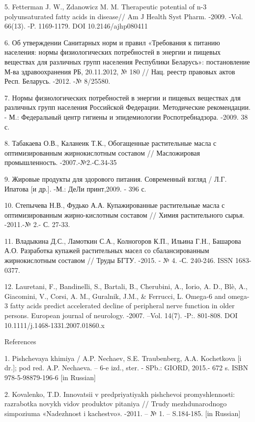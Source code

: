 5. Fetterman J. W., Zdanowicz M. M. Therapeutic potential of n-3
polyunsaturated fatty acids in disease// Am J Health Syst Pharm. -2009.
-Vol. 66(13). -P. 1169-1179. DOI 10.2146/ajhp080411

6. Об утверждении Санитарных норм и правил «Требования к питанию
населения: нормы физиологических потребностей в энергии и пищевых
веществах для различных групп населения Республики Беларусь»:
постановление М-ва здравоохранения РБ, 20.11.2012, № 180 // Нац. реестр
правовых актов Респ. Беларусь. -2012. -№ 8/25580.

7. Нормы физиологических потребностей в энергии и пищевых веществах для
различных групп населения Российской Федерации. Методические
рекомендации. - М.: Федеральный центр гигиены и эпидемиологии
Роспотребнадзора. -2009. 38 с.

8. Табакаева О.В., Каланеик Т.К., Обогащенные растительные масла с
оптимизированным жирнокислотным составом // Масложировая промышленность.
-2007.-№2.-С.34-35

9. Жировые продукты для здорового питания. Современный взгляд / Л.Г.
Ипатова {[}и др.{]}. -М.: ДеЛи принт,2009. - 396 с.

10. Степычева Н.В., Фудько А.А. Купажированные растительные масла с
оптимизированным жирно-кислотным составом // Химия растительного сырья.
-2011.-№ 2.- С. 27-33.

11. Владыкина Д.С., Ламоткин С.А., Колногоров К.П., Ильина Г.Н.,
Башарова А.О. Разработка купажей растительных масел со сбалансированным
жирнокислотным составом // Труды БГТУ. -2015. - № 4. -С. 240-246. ISSN
1683-0377.

12. Lauretani, F., Bandinelli, S., Bartali, B., Cherubini, A., Iorio, A.
D., Blè, A., Giacomini, V., Corsi, A. M., Guralnik, J.M., \& Ferrucci,
L. Omega-6 and omega-3 fatty acids predict accelerated decline of
peripheral nerve function in older persons. European journal of
neurology. -2007. --Vol. 14(7). -P:. 801-808. DOI
10.1111/j.1468-1331.2007.01860.x

References

1. Pishchevaya khimiya / A.P. Nechaev, S.E. Traubenberg, A.A. Kochetkova
{[}i dr.{]}; pod red. A.P. Nechaeva. -- 6-e izd., ster. - SPb.: GIORD,
2015.- 672 s. ISBN 978-5-98879-196-6 {[}in Russian{]}

2. Kovalenko, T.D. Innovatsii v predpriyatiyakh pishchevoi
promyshlennosti: razrabotka novykh vidov produktov pitaniya // Trudy
mezhdunarodnogo simpoziuma «Nadezhnost\textquotesingle{} i kachestvo».
-2011. -- № 1. -- S.184-185. {[}in Russian{]}

